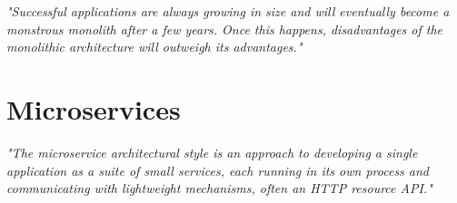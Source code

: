 \vspace*{\fill}

\begin{center}
\textit{"Successful applications
	are always growing in size and will eventually become a
	monstrous monolith after a few years. Once this happens,
	disadvantages of the monolithic architecture will outweigh
	its advantages."} \cite{DataflowDrivenChen}

\end{center}



\vspace*{\fill}


\section{Microservices}
\label{sec:background:microservices}

\vspace*{\fill}

\begin{center}
\textit{ "The microservice architectural style is an approach to developing a single application as a suite of small services, each running in its own process and communicating with lightweight mechanisms, often an HTTP resource API." \cite{Fowler} }
\end{center}

\vspace*{\fill}

